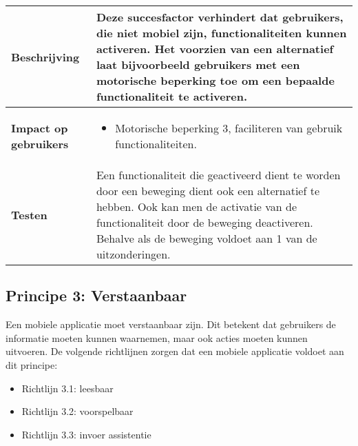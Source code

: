 \begin{table}[H]
\begin{tabular}{|l|p{12cm}|}
        \hline
        \textbf{Beschrijving}                 & Deze succesfactor verhindert dat gebruikers, die niet mobiel zijn, functionaliteiten kunnen activeren. Het voorzien van een alternatief laat bijvoorbeeld gebruikers met een motorische beperking toe om een bepaalde functionaliteit te activeren.   \\ 
        \hline
        \textbf{Impact op gebruikers}         &  
        \begin{itemize}
            \item Motorische beperking 3, faciliteren van gebruik functionaliteiten.
            
            
        \end{itemize}                                                                                                                                                                                                                                                                                                     \\ 
       
        \hline
        \textbf{Testen}                       & Een functionaliteit die geactiveerd dient te worden door een beweging dient ook een alternatief te hebben. Ook kan men de activatie van de functionaliteit door de beweging deactiveren.  Behalve als de beweging voldoet aan 1 van de uitzonderingen.                         \\
        \hline
    \end{tabular}
    
\end{table}
\subsection{Principe 3: Verstaanbaar}
\label{sec:verstaanbaarWCAG}
Een mobiele applicatie moet verstaanbaar zijn. Dit betekent dat gebruikers de informatie moeten kunnen waarnemen, maar ook acties moeten kunnen uitvoeren. De volgende richtlijnen zorgen dat een mobiele applicatie voldoet aan dit principe:
\begin{itemize}
    \item Richtlijn 3.1: leesbaar
    \item Richtlijn 3.2: voorspelbaar
    \item Richtlijn 3.3: invoer assistentie
\end{itemize}
